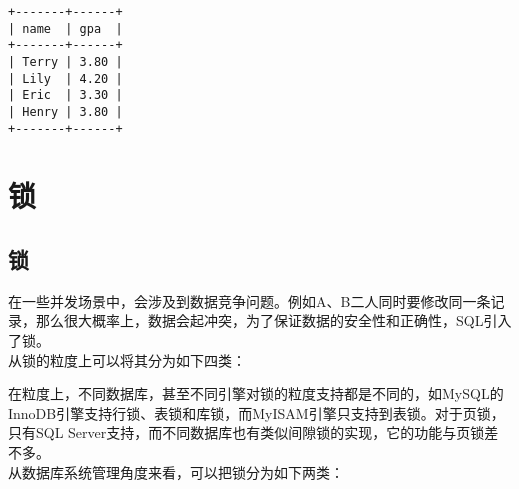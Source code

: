 \documentclass[12pt, openany, oneside]{book}
\begin{document}
\begin{tcolorbox}
	\begin{verbatim}
+-------+------+
| name  | gpa  |
+-------+------+
| Terry | 3.80 |
| Lily  | 4.20 |
| Eric  | 3.30 |
| Henry | 3.80 |
+-------+------+
	\end{verbatim}
\end{tcolorbox}

\newpage

\chapter{锁}

\section{锁}

在一些并发场景中，会涉及到数据竞争问题。例如A、B二人同时要修改同一条记录，那么很大概率上，数据会起冲突，为了保证数据的安全性和正确性，SQL引入了锁。\\

从锁的粒度上可以将其分为如下四类：

\begin{table}[H]
	\centering
	\caption{锁的粒度分类}
\end{table}

在粒度上，不同数据库，甚至不同引擎对锁的粒度支持都是不同的，如MySQL的InnoDB引擎支持行锁、表锁和库锁，而MyISAM引擎只支持到表锁。对于页锁，只有SQL Server支持，而不同数据库也有类似间隙锁的实现，它的功能与页锁差不多。\\

从数据库系统管理角度来看，可以把锁分为如下两类：
\end{document}
